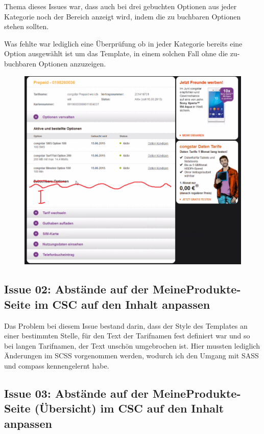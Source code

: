 \documentclass[11pt,a4paper]{article} %
\begin{document}
Thema dieses Issues war, dass auch bei drei gebuchten Optionen aus jeder Kategorie noch der Bereich anzeigt wird,
indem die zu buchbaren Optionen stehen sollten. 

Was fehlte war lediglich eine Überprüfung ob in jeder Kategorie bereits eine Option ausgewählt ist um das Template,
in einem solchen Fall ohne die zu-buchbaren Optionen anzuzeigen.

\begin{figure}[h]
\includegraphics[width=\textwidth]{images/optionenzubuchung.PNG}
\centering
\end{figure}


\subsection{Issue 02: Abstände auf der MeineProdukte-Seite im CSC auf den Inhalt anpassen} \label{sec:issue02}

Das Problem bei diesem Issue bestand darin, dass der Style des Templates an einer bestimmten Stelle, für den Text
der Tarifnamen fest definiert war und so bei langen Tarifnamen, der Text unschön umgebrochen ist.
Hier mussten lediglich Änderungen im SCSS vorgenommen werden, wodurch ich den Umgang mit SASS und compass
kennengelernt habe.


\subsection{Issue 03: Abstände auf der MeineProdukte-Seite (Übersicht) im CSC auf den Inhalt anpassen} 
\end{document}
